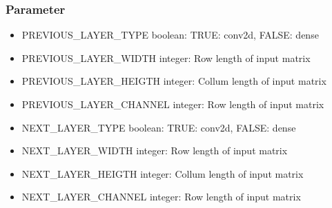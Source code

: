 \subsubsection{Parameter}
\begin{itemize}
	\item PREVIOUS\_LAYER\_TYPE boolean: {TRUE: conv2d, FALSE: dense} %
	\item PREVIOUS\_LAYER\_WIDTH integer: {Row length of input matrix} 
	\item PREVIOUS\_LAYER\_HEIGTH integer: {Collum length of input matrix}
	\item PREVIOUS\_LAYER\_CHANNEL integer: {Row length of input matrix}
	\item NEXT\_LAYER\_TYPE boolean: {TRUE: conv2d, FALSE: dense} %
	\item NEXT\_LAYER\_WIDTH integer: {Row length of input matrix} 
	\item NEXT\_LAYER\_HEIGTH integer: {Collum length of input matrix}
	\item NEXT\_LAYER\_CHANNEL integer: {Row length of input matrix}
\end{itemize}